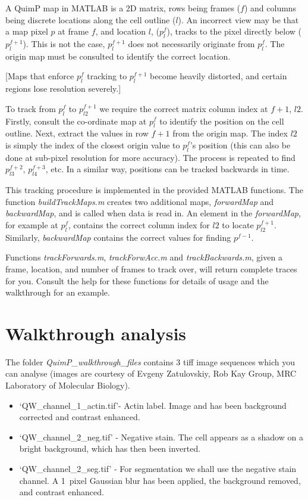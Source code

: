 \documentclass[a4paper,12pt]{article}
\begin{document}
A QuimP map in MATLAB is a 2D matrix, rows being frames ($f$) and columns being discrete locations along the cell outline ($l$).
An incorrect view may be that a map pixel $p$ at frame $f$, and location $l$, ($p^{f}_{l}$),  tracks to the pixel directly 
below ($p^{f+1}_{l}$).  This is not the case,
$p^{f+1}_{l}$ does not necessarily originate from $p^{f}_{l}$.  The origin map must be consulted to identify the
correct location.

[Maps that enforce $p^{f}_{l}$ tracking to $p^{f+1}_{l}$ become heavily distorted, and certain regions lose
resolution severely.]

To track from $p^{f}_{l}$ to $p^{f+1}_{l2}$ we require the correct matrix column index at $f+1$, $l2$.  Firstly, 
consult the co-ordinate map at $p^{f}_{l}$ to identify the position on the cell outline.  Next, extract
the values in row $f+1$ from the origin map.  The index $l2$ is simply the index of the closest origin value to $p^{f}_{l}$'s position
(this can also be done at sub-pixel resolution for more accuracy).
The process is repeated to find $p^{f+2}_{l3}$, $p^{f+3}_{l4}$, etc.  In a similar way, positions can be tracked backwards in time.

This tracking procedure is implemented in the provided MATLAB functions. The function \textit{buildTrackMaps.m} creates
two additional maps, \textit{forwardMap} and \textit{backwardMap}, and is called when data is read in.
An element in the \textit{forwardMap}, for example at $p^{f}_{l}$, contains the correct column index for $l2$ to
locate $p^{f+1}_{l2}$.  Similarly, \textit{backwardMap} contains the correct values for finding $p^{f-1}$.

Functions \textit{trackForwards.m}, \textit{trackForwAcc.m} and \textit{trackBackwards.m}, given a frame, location,
and number of frames to track over, will return complete traces for you.
Consult the help for these functions for details of usage and the walkthrough for an example.


\section{Walkthrough analysis}
\label{walkthrough}

The folder \emph{QuimP\_walkthrough\_files} contains 3 tiff image sequences which you can
analyse (images are courtesy of Evgeny Zatulovskiy, Rob Kay Group, MRC Laboratory of Molecular Biology).

\begin{itemize}
	\item `QW\_channel\_1\_actin.tif'- Actin label.  Image and has been background corrected and contrast enhanced.
	\item `QW\_channel\_2\_neg.tif' - Negative stain.  The cell appears as a shadow on a bright
	background, which has then been inverted.
	\item `QW\_channel\_2\_seg.tif' - For segmentation we shall use the negative stain channel.  
	A 1~pixel Gaussian blur has been applied, the background removed, and contrast enhanced.  
\end{itemize}
\end{document}
